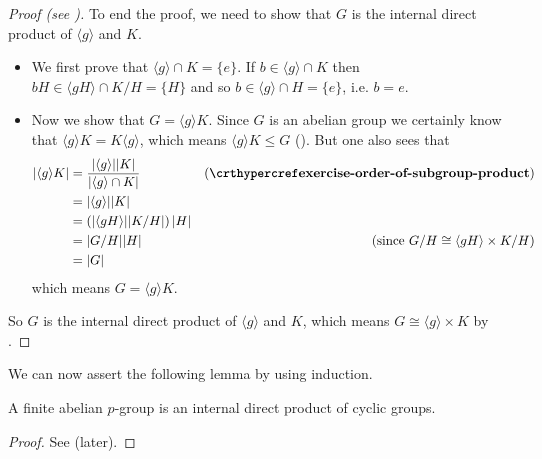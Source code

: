 \begin{proof}[Proof (see {\cite[Lemma 13.9]{judson_beezer_2022}})]
    To end the proof, we need to show that $G$ is the internal direct product of $\langle g\rangle$ and $K$.
    \begin{itemize}
        \item We first prove that $\langle g\rangle \cap K = \{e\}$. If $b \in \langle g\rangle \cap K$ then $bH \in \langle gH\rangle \cap K/H = \{H\}$ and so $b \in \langle g \rangle \cap H = \{e\}$, i.e. $b = e$.

        \item Now we show that $G = \langle g\rangle K$. Since $G$ is an abelian group we certainly know that $\langle g\rangle K = K\langle g\rangle$, which means $\langle g\rangle K \leq G$ (). But one also sees that
        \begin{align*}
            |\langle g\rangle K| &= \frac{|\langle g\rangle||K|}{|\langle g\rangle \cap K|} & (\myref{exercise-order-of-subgroup-product})\\
            &= |\langle g\rangle||K|\\
            &= \left(|\langle gH \rangle||K/H|\right)|H|\\
            &= |G/H||H| & (\text{since }G/H \cong \langle gH \rangle \times K/H)\\
            &= |G|
        \end{align*}
        which means $G = \langle g\rangle K$.
    \end{itemize}
    So $G$ is the internal direct product of $\langle g\rangle$ and $K$, which means $G \cong \langle g\rangle \times K$ by .
\end{proof}

We can now assert the following lemma by using induction.
\begin{lemma}\label{lemma-fundamental-theorem-of-finite-abelian-groups-3}
    A finite abelian $p$-group is an internal direct product of cyclic groups.
\end{lemma}
\begin{proof}
    See  (later).
\end{proof}

